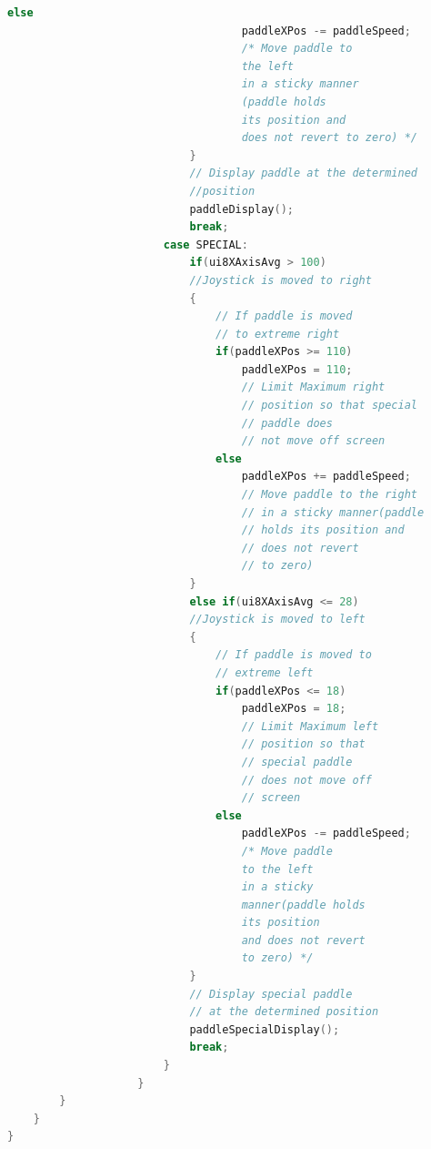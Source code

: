 \documentclass{article}
\begin{document}
\begin{lstlisting}[basicstyle = \small, language = C]
                                else
                                    paddleXPos -= paddleSpeed; 
                                    /* Move paddle to 
                                    the left
                                    in a sticky manner
                                    (paddle holds 
                                    its position and 
                                    does not revert to zero) */
                            }
                            // Display paddle at the determined 
                            //position
                            paddleDisplay();
                            break;
                        case SPECIAL:
                            if(ui8XAxisAvg > 100) 
                            //Joystick is moved to right
                            {
                                // If paddle is moved 
                                // to extreme right
                                if(paddleXPos >= 110)
                                    paddleXPos = 110; 
                                    // Limit Maximum right
                                    // position so that special
                                    // paddle does 
                                    // not move off screen
                                else
                                    paddleXPos += paddleSpeed; 
                                    // Move paddle to the right 
                                    // in a sticky manner(paddle 
                                    // holds its position and 
                                    // does not revert
                                    // to zero)
                            }
                            else if(ui8XAxisAvg <= 28) 
                            //Joystick is moved to left
                            {
                                // If paddle is moved to 
                                // extreme left
                                if(paddleXPos <= 18)
                                    paddleXPos = 18; 
                                    // Limit Maximum left 
                                    // position so that 
                                    // special paddle 
                                    // does not move off 
                                    // screen
                                else
                                    paddleXPos -= paddleSpeed; 
                                    /* Move paddle 
                                    to the left 
                                    in a sticky 
                                    manner(paddle holds 
                                    its position 
                                    and does not revert 
                                    to zero) */
                            }
                            // Display special paddle 
                            // at the determined position
                            paddleSpecialDisplay();
                            break;
                        }
                    }
        }
    }
}
  \end{lstlisting}
\end{document}

